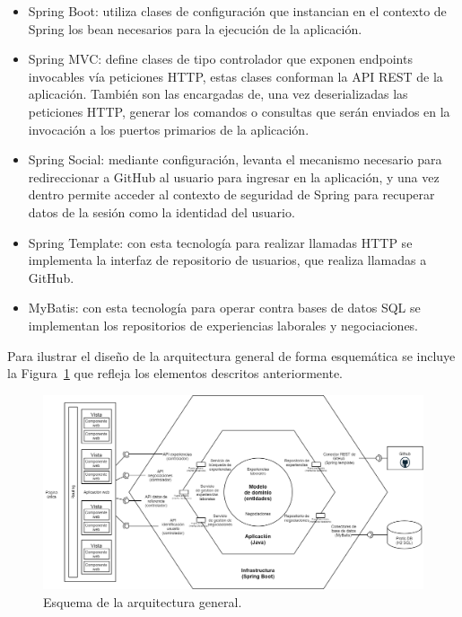 \documentclass[a4paper, 12pt]{book}
\begin{document}
\begin{itemize}
        \begin{itemize}
            \item Spring Boot: utiliza clases de configuración que instancian en el contexto de Spring los bean necesarios para la ejecución de la aplicación.
            \item Spring MVC: define clases de tipo controlador que exponen endpoints invocables vía peticiones HTTP, estas clases conforman la API REST de la aplicación. También son las encargadas de, una vez deserializadas las peticiones HTTP, generar los comandos o consultas que serán enviados en la invocación a los puertos primarios de la aplicación.
            \item Spring Social: mediante configuración, levanta el mecanismo necesario para redireccionar a GitHub al usuario para ingresar en la aplicación, y una vez dentro permite acceder al contexto de seguridad de Spring para recuperar datos de la sesión como la identidad del usuario.
            \item Spring Template: con esta tecnología para realizar llamadas HTTP se implementa la interfaz de repositorio de usuarios, que realiza llamadas a GitHub.
            \item MyBatis: con esta tecnología para operar contra bases de datos SQL se implementan los repositorios de experiencias laborales y negociaciones.
        \end{itemize}

    \end{itemize}


    Para ilustrar el diseño de la arquitectura general de forma esquemática se incluye la Figura~\ref{fig:general_architecture} que refleja los elementos descritos anteriormente.

    \begin{figure}
        \centering
        \includegraphics[width=15cm, keepaspectratio]{img/Arquitectura_hexagonal.png}
        \caption{Esquema de la arquitectura general.}\label{fig:general_architecture}
    \end{figure}
\end{document}
